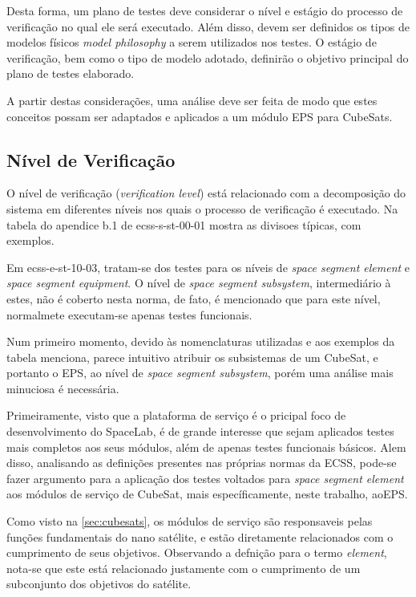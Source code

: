 Desta forma, um plano de testes deve considerar o nível e estágio do processo de verificação no qual ele será executado.
Além disso, devem ser definidos os tipos de modelos físicos \textit{model philosophy} a serem utilizados nos testes.
O estágio de verificação, bem como o tipo de modelo adotado, definirão o objetivo principal do plano de testes elaborado.

A partir destas considerações, uma análise deve ser feita de modo que estes conceitos possam ser adaptados e aplicados a um módulo \gls{EPS} para CubeSats.


\subsection{Nível de Verificação}


O nível de verificação (\textit{verification level}) está relacionado com a decomposição do sistema em diferentes níveis nos quais o processo de verificação é executado.
Na tabela do apendice b.1 de ecss-s-st-00-01 mostra as divisoes típicas, com exemplos.

Em ecss-e-st-10-03, tratam-se dos testes para os níveis de \textit{space segment element} e \textit{space segment equipment}. O nível de \textit{space segment subsystem}, intermediário à estes, não é coberto nesta norma, de fato, é mencionado que para este nível, normalmete executam-se apenas testes funcionais.

Num primeiro momento, devido às nomenclaturas utilizadas e aos exemplos da tabela menciona, parece intuitivo atribuir os subsistemas de um CubeSat, e portanto o \gls{EPS}, ao nível de \textit{space segment subsystem}, porém uma análise mais minuciosa é necessária.

Primeiramente, visto que a plataforma de serviço é o pricipal foco de desenvolvimento do SpaceLab, é de grande interesse que sejam aplicados testes mais completos aos seus módulos, além de apenas testes funcionais básicos.
Alem disso, analisando as definições presentes nas próprias normas da \gls{ECSS}, pode-se fazer argumento para a aplicação dos testes voltados para \textit{space segment element} aos módulos de serviço de CubeSat, mais específicamente, neste trabalho, ao\gls{EPS}.

Como visto na \autoref{sec:cubesats}, os módulos de serviço são responsaveis pelas funções fundamentais do nano satélite, e estão diretamente relacionados com o cumprimento de seus objetivos.
Observando a defnição para o termo \textit{element}, nota-se que este está relacionado justamente com o cumprimento de um subconjunto dos objetivos do satélite.

